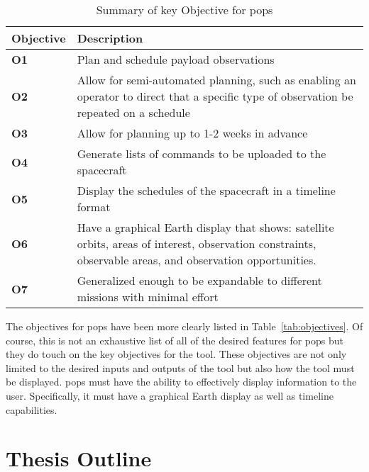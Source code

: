 \begin{table}[h]
    \centering
    \caption{Summary of key Objective for \gls{pops}}
    \label{objectives}
    \begin{tabular}{|P{0.11\textwidth}|p{0.8\textwidth}|}
\hline
    \textbf{Objective} & \textbf{Description} \\ \hline
    \textbf{O1} &  Plan and schedule payload observations          \\ \hline
    \textbf{O2} &  Allow for semi-automated planning, such as enabling an operator to direct that a specific type of observation be repeated on a schedule           \\ \hline
    \textbf{O3} & Allow for planning up to 1-2 weeks in advance  \\ \hline
    \textbf{O4} & Generate lists of commands to be uploaded to the spacecraft          \\ \hline
    \textbf{O5} &  Display the schedules of the spacecraft in a timeline format   \\ \hline
    \textbf{O6} & Have a graphical Earth display that shows: satellite orbits, areas of interest, observation constraints, observable areas, and observation opportunities. \\ \hline
    \textbf{O7} & Generalized enough to be expandable to different missions with minimal effort  \\ \hline
\end{tabular}
\end{table}

The objectives for \gls{pops} have been more clearly listed in
Table~\ref{tab:objectives}. Of course, this is not an exhaustive list of all of
the desired features for \gls{pops} but they do touch on the key objectives for
the tool. These objectives are not only limited to the desired inputs and
outputs of the tool but also how the tool must be displayed. \gls{pops} must
have the ability to effectively display information to the user. Specifically,
it must have a graphical Earth display as well as timeline capabilities.


\section{Thesis Outline} 

